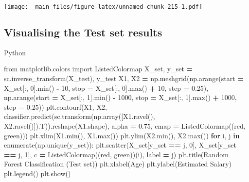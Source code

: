 \documentclass[
]{book}
\newenvironment{Shaded}{\begin{snugshade}}{\end{snugshade}}
\newcommand{\BuiltInTok}[1]{#1}
\newcommand{\ControlFlowTok}[1]{\textcolor[rgb]{0.13,0.29,0.53}{\textbf{#1}}}
\newcommand{\DecValTok}[1]{\textcolor[rgb]{0.00,0.00,0.81}{#1}}
\newcommand{\FloatTok}[1]{\textcolor[rgb]{0.00,0.00,0.81}{#1}}
\newcommand{\ImportTok}[1]{#1}
\newcommand{\KeywordTok}[1]{\textcolor[rgb]{0.13,0.29,0.53}{\textbf{#1}}}
\newcommand{\NormalTok}[1]{#1}
\newcommand{\OperatorTok}[1]{\textcolor[rgb]{0.81,0.36,0.00}{\textbf{#1}}}
\newcommand{\StringTok}[1]{\textcolor[rgb]{0.31,0.60,0.02}{#1}}
\theoremstyle{definition}
\theoremstyle{definition}
\theoremstyle{definition}
\theoremstyle{definition}
\theoremstyle{remark}
\begin{document}
\texttt{[image: \_main\_files/figure-latex/unnamed-chunk-215-1.pdf]}

\hypertarget{visualising-the-test-set-results-7}{%
\subsection{Visualising the Test set results}\label{visualising-the-test-set-results-7}}

Python

\begin{Shaded}
\begin{Highlighting}[]
\ImportTok{from}\NormalTok{ matplotlib.colors }\ImportTok{import}\NormalTok{ ListedColormap}
\NormalTok{X\_set, y\_set }\OperatorTok{=}\NormalTok{ sc.inverse\_transform(X\_test), y\_test}
\NormalTok{X1, X2 }\OperatorTok{=}\NormalTok{ np.meshgrid(np.arange(start }\OperatorTok{=}\NormalTok{ X\_set[:, }\DecValTok{0}\NormalTok{].}\BuiltInTok{min}\NormalTok{() }\OperatorTok{{-}} \DecValTok{10}\NormalTok{, stop }\OperatorTok{=}\NormalTok{ X\_set[:, }\DecValTok{0}\NormalTok{].}\BuiltInTok{max}\NormalTok{() }\OperatorTok{+} \DecValTok{10}\NormalTok{, step }\OperatorTok{=} \FloatTok{0.25}\NormalTok{),}
\NormalTok{                     np.arange(start }\OperatorTok{=}\NormalTok{ X\_set[:, }\DecValTok{1}\NormalTok{].}\BuiltInTok{min}\NormalTok{() }\OperatorTok{{-}} \DecValTok{1000}\NormalTok{, stop }\OperatorTok{=}\NormalTok{ X\_set[:, }\DecValTok{1}\NormalTok{].}\BuiltInTok{max}\NormalTok{() }\OperatorTok{+} \DecValTok{1000}\NormalTok{, step }\OperatorTok{=} \FloatTok{0.25}\NormalTok{))}
\NormalTok{plt.contourf(X1, X2, classifier.predict(sc.transform(np.array([X1.ravel(), X2.ravel()]).T)).reshape(X1.shape),}
\NormalTok{             alpha }\OperatorTok{=} \FloatTok{0.75}\NormalTok{, cmap }\OperatorTok{=}\NormalTok{ ListedColormap((}\StringTok{\textquotesingle{}red\textquotesingle{}}\NormalTok{, }\StringTok{\textquotesingle{}green\textquotesingle{}}\NormalTok{)))}
\NormalTok{plt.xlim(X1.}\BuiltInTok{min}\NormalTok{(), X1.}\BuiltInTok{max}\NormalTok{())}
\NormalTok{plt.ylim(X2.}\BuiltInTok{min}\NormalTok{(), X2.}\BuiltInTok{max}\NormalTok{())}
\ControlFlowTok{for}\NormalTok{ i, j }\KeywordTok{in} \BuiltInTok{enumerate}\NormalTok{(np.unique(y\_set)):}
\NormalTok{    plt.scatter(X\_set[y\_set }\OperatorTok{==}\NormalTok{ j, }\DecValTok{0}\NormalTok{], X\_set[y\_set }\OperatorTok{==}\NormalTok{ j, }\DecValTok{1}\NormalTok{], c }\OperatorTok{=}\NormalTok{ ListedColormap((}\StringTok{\textquotesingle{}red\textquotesingle{}}\NormalTok{, }\StringTok{\textquotesingle{}green\textquotesingle{}}\NormalTok{))(i), label }\OperatorTok{=}\NormalTok{ j)}
\NormalTok{plt.title(}\StringTok{\textquotesingle{}Random Forest Classification (Test set)\textquotesingle{}}\NormalTok{)}
\NormalTok{plt.xlabel(}\StringTok{\textquotesingle{}Age\textquotesingle{}}\NormalTok{)}
\NormalTok{plt.ylabel(}\StringTok{\textquotesingle{}Estimated Salary\textquotesingle{}}\NormalTok{)}
\NormalTok{plt.legend()}
\NormalTok{plt.show()}
\end{Highlighting}
\end{Shaded}
\end{document}

